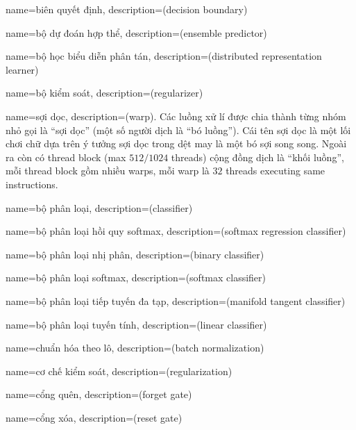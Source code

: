 {
    name={biên quyết định},
    description={(decision boundary)}
}

{
    name={bộ dự đoán hợp thể},
    description={(ensemble predictor)}
}

{
    name={bộ học biểu diễn phân tán},
    description={(distributed representation learner)}
}

{
    name={bộ kiểm soát},
    description={(regularizer)}
}


{
    name={sợi dọc},
    description={(warp). Các luồng xử lí được chia thành từng nhóm nhỏ gọi là
    ``sợi dọc'' (một số người dịch là ``bó luồng''). Cái tên sợi dọc là một lối
    chơi chữ dựa trên ý tưởng sợi dọc trong dệt may là một bó sợi song song.
    Ngoài ra còn có thread block (max $512/1024$
    threads) cộng đồng dịch là ``khối luồng'', mỗi thread block gồm nhiều warps,
    mỗi warp là $32$ threads executing same instructions.}
}

{
    name={bộ phân loại},
    description={(classifier)}
}

{
    name={bộ phân loại hồi quy softmax},
    description={(softmax regression classifier)}
}

{
    name={bộ phân loại nhị phân},
    description={(binary classifier)}
}

{
    name={bộ phân loại softmax},
    description={(softmax classifier)}
}

{
    name={bộ phân loại tiếp tuyến đa tạp},
    description={(manifold tangent classifier)}
}

{
    name={bộ phân loại tuyến tính},
    description={(linear classifier)}
}

{
    name={chuẩn hóa theo lô},
    description={(batch normalization)}
}

{
    name={cơ chế kiểm soát},
    description={(regularization)}
}

{
    name={cổng quên},
    description={(forget gate)}
}

{
    name={cổng xóa},
    description={(reset gate)}
}

